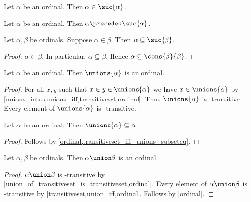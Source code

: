 \begin{proposition}\label{ordinal_in_suc}
    Let $\alpha$ be an ordinal.
    Then $\alpha\in\suc{\alpha}$.
\end{proposition}

\begin{corollary}\label{ordinal_precedes_suc}
    Let $\alpha$ be an ordinal.
    Then $\alpha\precedes \suc{\alpha}$.
\end{corollary}

\begin{proposition}\label{ordinal_elem_implies_subset_of_suc}
    Let $\alpha,\beta$ be ordinals.
    Suppose $\alpha\in\beta$.
    Then $\alpha\subseteq\suc{\beta}$.
\end{proposition}
\begin{proof}
    $\alpha\subset \beta$.
    In particular, $\alpha\subseteq \beta$.
    Hence $\alpha\subseteq \cons{\beta}{\beta}$.
\end{proof}

\begin{proposition}\label{unions_of_ordinal_is_ordinal}
    Let $\alpha$ be an ordinal.
    Then $\unions{\alpha}$ is an ordinal.
\end{proposition}
\begin{proof}
    For all $x, y$ such that $x\in y\in \unions{\alpha}$ we have $x\in \unions{\alpha}$
        by \cref{unions_intro,unions_iff,transitiveset,ordinal}.
    Thus $\unions{\alpha}$ is \in-transitive.
    Every element of $\unions{\alpha}$ is \in-transitive.
\end{proof}

\begin{lemma}\label{ordinal_subseteq_unions}
    Let $\alpha$ be an ordinal.
    Then $\unions{\alpha}\subseteq \alpha$.
\end{lemma}
\begin{proof}
    Follows by \cref{ordinal,transitiveset_iff_unions_subseteq}.
\end{proof}

\begin{proposition}\label{union_of_two_ordinals_is_ordinal}
    Let $\alpha,\beta$ be ordinals.
    Then $\alpha\union\beta$ is an ordinal.
\end{proposition}
\begin{proof}
    $\alpha\union\beta$ is \in-transitive by \cref{union_of_transitiveset_is_transitiveset,ordinal}.
    Every element of $\alpha\union\beta$ is \in-transitive
        by \cref{transitiveset,union_iff,ordinal}.
    Follows by \cref{ordinal}.
\end{proof}

